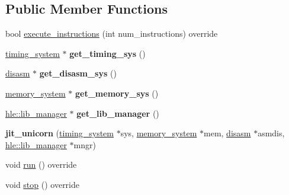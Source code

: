 \subsection*{Public Member Functions}
\begin{DoxyCompactItemize}
\item 
bool \mbox{\hyperlink{classeka2l1_1_1arm_1_1jit__unicorn_a3a03be2a0e9c1ea1f83b74fdcdc3c7ce}{execute\+\_\+instructions}} (int num\+\_\+instructions) override
\item 
\mbox{\label{classeka2l1_1_1arm_1_1jit__unicorn_a9d0f4d57df9ec0583578e62a05f0d12b}} 
\mbox{\hyperlink{classeka2l1_1_1timing__system}{timing\+\_\+system}} $\ast$ {\bfseries get\+\_\+timing\+\_\+sys} ()
\item 
\mbox{\label{classeka2l1_1_1arm_1_1jit__unicorn_aec8e30d77dbe2d31a85ae6c8bab4ddbd}} 
\mbox{\hyperlink{classeka2l1_1_1disasm}{disasm}} $\ast$ {\bfseries get\+\_\+disasm\+\_\+sys} ()
\item 
\mbox{\label{classeka2l1_1_1arm_1_1jit__unicorn_a3f73775f1522610b40d0e5831b386d9a}} 
\mbox{\hyperlink{classeka2l1_1_1memory__system}{memory\+\_\+system}} $\ast$ {\bfseries get\+\_\+memory\+\_\+sys} ()
\item 
\mbox{\label{classeka2l1_1_1arm_1_1jit__unicorn_a530409d2b2dbe7ceb46006fb429412be}} 
\mbox{\hyperlink{classeka2l1_1_1hle_1_1lib__manager}{hle\+::lib\+\_\+manager}} $\ast$ {\bfseries get\+\_\+lib\+\_\+manager} ()
\item 
\mbox{\label{classeka2l1_1_1arm_1_1jit__unicorn_a42a32d0896ae8a9388a0cdbc7dfa29b5}} 
{\bfseries jit\+\_\+unicorn} (\mbox{\hyperlink{classeka2l1_1_1timing__system}{timing\+\_\+system}} $\ast$sys, \mbox{\hyperlink{classeka2l1_1_1memory__system}{memory\+\_\+system}} $\ast$mem, \mbox{\hyperlink{classeka2l1_1_1disasm}{disasm}} $\ast$asmdis, \mbox{\hyperlink{classeka2l1_1_1hle_1_1lib__manager}{hle\+::lib\+\_\+manager}} $\ast$mngr)
\item 
void \mbox{\hyperlink{classeka2l1_1_1arm_1_1jit__unicorn_a98e8406378258c67449780280d839ac3}{run}} () override
\item 
void \mbox{\hyperlink{classeka2l1_1_1arm_1_1jit__unicorn_ab3ca860b367d833950226b0d7f95edc5}{stop}} () override

\end{DoxyCompactItemize}
